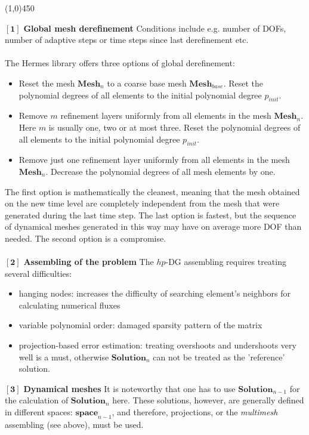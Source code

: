 \begin{center}
\line(1,0){450}
\end{center}
$\mathbf{[1]}$ \textbf{Global mesh derefinement} Conditions include e.g. number of DOFs, number of adaptive steps or time steps since last derefinement etc.\\\ \\
The Hermes library offers three options of global derefinement:\\
\begin{itemize}
\item Reset the mesh $\mathbf{Mesh}_n$ to a coarse base mesh $\mathbf{Mesh}_{base}$. Reset the 
      polynomial degrees of all elements to the initial polynomial degree $p_{init}$.
\item Remove $m$ refinement layers uniformly from all elements in the mesh $\mathbf{Mesh}_n$. Here $m$ 
      is usually one, two or at most three. Reset the polynomial degrees of all elements
      to the initial polynomial degree $p_{init}$.
\item Remove just one refinement layer uniformly from all elements in the mesh $\mathbf{Mesh}_n$. 
      Decrease the polynomial degrees of all mesh elements by one.
\end{itemize}
The first option is mathematically the cleanest, meaning that the mesh obtained 
on the new time level are completely independent from the mesh that were
generated during the last time step. The last option is fastest, but the 
sequence of dynamical meshes generated in this way may have on average 
more DOF than needed. The second option is a compromise.\\\ \\
$\mathbf{[2]}$ \textbf{Assembling of the problem} The $hp$-DG assembling requires treating several difficulties:
\begin{itemize}
\item hanging nodes: increases the difficulty of searching element's neighbors for calculating numerical fluxes
\item variable polynomial order: damaged sparsity pattern of the matrix
\item projection-based error estimation: treating overshoots and undershoots very well is a must, otherwise $\mathbf{Solution}_n$ can not be treated as the 'reference' solution.
\end{itemize}
$\mathbf{[3]}$ \textbf{Dynamical meshes} It is noteworthy that one has to use $\mathbf{Solution}_{n-1}$ for the calculation of $\mathbf{Solution}_n$ here.
These solutions, however, are generally defined in different spaces: $\mathbf{space}_{n-1}$, and therefore, projections, or the \emph{multimesh} assembling (see above), must be used.\\\ \\
